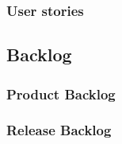 \begin{frame}
	\begin{center}
		\frametitle{User stories}
	\end{center}
\end{frame}

\subsection{Backlog}

\begin{frame}
	\begin{center}
		\frametitle{Product Backlog}
	\end{center}
\end{frame}

\begin{frame}
	\begin{center}
		\frametitle{Release Backlog}
	\end{center}
\end{frame}
